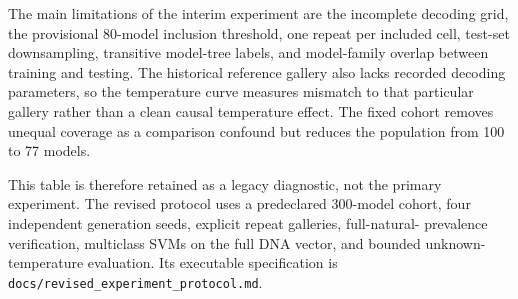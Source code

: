 \documentclass[11pt,a4paper]{article}
\begin{document}
The main limitations of the interim experiment are the incomplete decoding
grid, the provisional 80-model inclusion threshold, one repeat per included
cell, test-set downsampling, transitive model-tree labels, and model-family
overlap between training and testing. The historical reference gallery also
lacks recorded decoding parameters, so the temperature curve measures mismatch
to that particular gallery rather than a clean causal temperature effect. The
fixed cohort removes unequal coverage as a comparison confound but reduces the
population from 100 to 77 models.

This table is therefore retained as a legacy diagnostic, not the primary
experiment. The revised protocol uses a predeclared 300-model cohort, four
independent generation seeds, explicit repeat galleries, full-natural-
prevalence verification, multiclass SVMs on the full DNA vector, and bounded
unknown-temperature evaluation. Its executable specification is
\texttt{docs/revised\_experiment\_protocol.md}.
\end{document}
